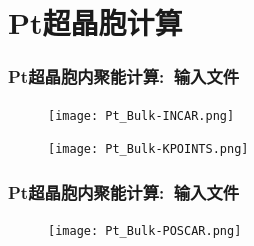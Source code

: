 \section{{\rm Pt}超晶胞计算}\label{Sec:bulk-Pt}
\frame
{
	\frametitle{\textrm{Pt}超晶胞内聚能计算:~输入文件}
	{\fontsize{7.4pt}{5.2pt}}
\begin{figure}[h!]
\centering
\texttt{[image: Pt\_Bulk-INCAR.png]}
\caption{\fontsize{6.2pt}{5.2pt}}%
\label{Pt_Bulk-INCAR-modified}
\end{figure}
\begin{figure}[h!]
\centering
\vskip -3pt
\texttt{[image: Pt\_Bulk-KPOINTS.png]}
\caption{\fontsize{6.2pt}{5.2pt}}%
\label{Pt_Bulk-KPOINTS}
\end{figure}
{\fontsize{6.2pt}{5.2pt}}%
}

\frame
{
	\frametitle{\textrm{Pt}超晶胞内聚能计算:~输入文件}
\begin{figure}[h!]
\centering
\vskip -5pt
\texttt{[image: Pt\_Bulk-POSCAR.png]}
\caption{\fontsize{6.2pt}{5.2pt}}%
\label{Pt_Bulk-POSCAR}
\end{figure}
}

